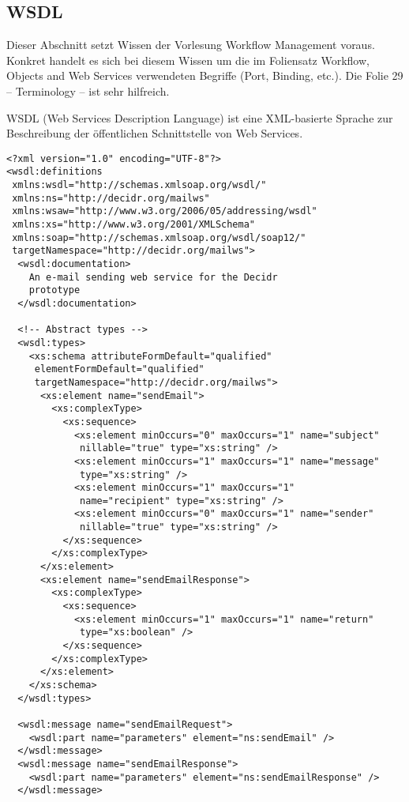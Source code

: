 \documentclass[runningheads]{llncs}
\newcommand{\germanquote}[1]{\glqq{}#1\grqq{}}
\begin{document}
  \subsection{WSDL}
  \label{wsdl}
  \nocite{wk_wsdl}
    Dieser Abschnitt setzt Wissen der Vorlesung \germanquote{Workflow Management}\cite{wfm_site} voraus. Konkret handelt es sich bei diesem Wissen um die im Foliensatz \germanquote{Workflow, Objects and Web Services}\cite{wfm_ch7} verwendeten Begriffe (Port, Binding, etc.). Die Folie 29 -- Terminology -- ist sehr hilfreich.

    WSDL (Web Services Description Language) ist eine XML-basierte Sprache zur Beschreibung der öffentlichen Schnittstelle von Web Services.

    \newpage
    \label{ex_wsdl}
    \begin{verbatim}
<?xml version="1.0" encoding="UTF-8"?>
<wsdl:definitions
 xmlns:wsdl="http://schemas.xmlsoap.org/wsdl/"
 xmlns:ns="http://decidr.org/mailws"
 xmlns:wsaw="http://www.w3.org/2006/05/addressing/wsdl"
 xmlns:xs="http://www.w3.org/2001/XMLSchema"
 xmlns:soap="http://schemas.xmlsoap.org/wsdl/soap12/"
 targetNamespace="http://decidr.org/mailws">
  <wsdl:documentation>
    An e-mail sending web service for the Decidr
    prototype
  </wsdl:documentation>

  <!-- Abstract types -->
  <wsdl:types>
    <xs:schema attributeFormDefault="qualified"
     elementFormDefault="qualified"
     targetNamespace="http://decidr.org/mailws">
      <xs:element name="sendEmail">
        <xs:complexType>
          <xs:sequence>
            <xs:element minOccurs="0" maxOccurs="1" name="subject"
             nillable="true" type="xs:string" />
            <xs:element minOccurs="1" maxOccurs="1" name="message"
             type="xs:string" />
            <xs:element minOccurs="1" maxOccurs="1"
             name="recipient" type="xs:string" />
            <xs:element minOccurs="0" maxOccurs="1" name="sender"
             nillable="true" type="xs:string" />
          </xs:sequence>
        </xs:complexType>
      </xs:element>
      <xs:element name="sendEmailResponse">
        <xs:complexType>
          <xs:sequence>
            <xs:element minOccurs="1" maxOccurs="1" name="return"
             type="xs:boolean" />
          </xs:sequence>
        </xs:complexType>
      </xs:element>
    </xs:schema>
  </wsdl:types>

  <wsdl:message name="sendEmailRequest">
    <wsdl:part name="parameters" element="ns:sendEmail" />
  </wsdl:message>
  <wsdl:message name="sendEmailResponse">
    <wsdl:part name="parameters" element="ns:sendEmailResponse" />
  </wsdl:message>


\end{verbatim}
\end{document}
